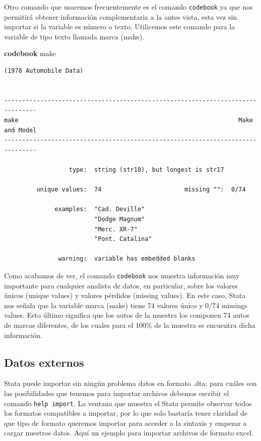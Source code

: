 \documentclass[
]{book}
\newenvironment{Shaded}{\begin{snugshade}}{\end{snugshade}}
\newcommand{\KeywordTok}[1]{\textcolor[rgb]{0.13,0.29,0.53}{\textbf{#1}}}
\newcommand{\NormalTok}[1]{#1}
\theoremstyle{definition}
\theoremstyle{definition}
\theoremstyle{definition}
\theoremstyle{definition}
\theoremstyle{remark}
\begin{document}
Otro comando que usaremos frecuentemente es el comando \texttt{codebook} ya que nos permitirá obtener información complementaria a la antes vista, esta vez sin importar si la variable es número o texto. Utilicemos este comando para la variable de tipo texto llamada marca (make).

\begin{Shaded}
\begin{Highlighting}[]
\KeywordTok{codebook}\NormalTok{ make}
\end{Highlighting}
\end{Shaded}

\begin{verbatim}
(1978 Automobile Data)


-------------------------------------------------------------------------------
make                                                             Make and Model
-------------------------------------------------------------------------------

                  type:  string (str18), but longest is str17

         unique values:  74                       missing "":  0/74

              examples:  "Cad. Deville"
                         "Dodge Magnum"
                         "Merc. XR-7"
                         "Pont. Catalina"

               warning:  variable has embedded blanks
\end{verbatim}

Como acabamos de ver, el comando \texttt{codebook} nos muestra información muy importante para cualquier analista de datos, en particular, sobre los valores únicos (unique values) y valores pérdidos (missing values). En este caso, Stata nos señala que la variable marca (make) tiene 74 valores único y 0/74 missings values. Esto último significa que los autos de la muestra los componen 74 autos de marcas diferentes, de los cuales para el 100\% de la muestra se encuentra dicha información.

\hypertarget{datos-externos}{%
\subsection{Datos externos}\label{datos-externos}}

Stata puede importar sin ningún problema datos en formato .dta; para cuáles son las posibilidades que tenemos para importar archivos debemos escribir el comando \texttt{help\ import}. La ventana que muestra el Stata permite observar todos los formatos compatibles a importar, por lo que solo bastaría tener claridad de que tipo de formato queremos importar para acceder a la sintaxis y empezar a cargar nuestros datos. Aquí un ejemplo para importar archivos de formato excel.
\end{document}
